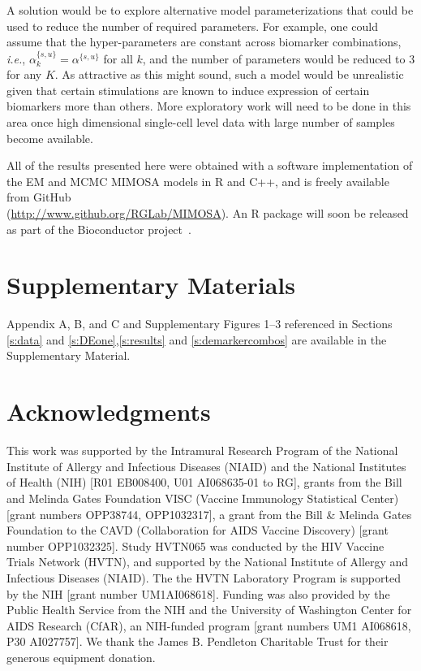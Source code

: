 \documentclass[12pt,oupdraft]{biostatistics}
\begin{document}
A solution would be to explore alternative model parameterizations that could be used to reduce the number of required parameters.
For example, one could assume that the hyper-parameters are constant across biomarker combinations, \textit{i.e.}, $\alpha^{\{s,u\}}_{k}=\alpha^{\{s,u\}}$ for all $k$, and the number of parameters would be reduced to $3$ for any $K$.
As attractive as this might sound, such a model would be unrealistic given that certain stimulations are known to induce expression of certain biomarkers more than others.
More exploratory work will need to be done in this area once high dimensional single-cell level data with large number of samples become available.

All of the results presented here were obtained with a software implementation of the EM and MCMC MIMOSA models in R and C++, and is freely available from GitHub \\
(\url{http://www.github.org/RGLab/MIMOSA}). An R package will soon be released as part of the Bioconductor project~\citep{Gentleman:2004tt}.

\section*{Supplementary Materials}

Appendix A, B, and C and Supplementary Figures 1--3 referenced in Sections \ref{s:data} and \ref{s:DEone},\ref{s:results} and \ref{s:demarkercombos} are available in the Supplementary Material.\vspace*{-8pt}

\section*{Acknowledgments}
This work was supported by the Intramural Research Program of the  National Institute of Allergy and Infectious Diseases (NIAID) and the National Institutes of Health (NIH) [R01 EB008400, U01 AI068635-01 to RG], grants from the Bill and Melinda Gates Foundation VISC (Vaccine Immunology Statistical Center) [grant numbers OPP38744,  OPP1032317], a grant from the Bill \& Melinda Gates Foundation to the CAVD (Collaboration for AIDS Vaccine Discovery) [grant number OPP1032325].  Study HVTN065 was conducted by the HIV Vaccine Trials Network (HVTN), and supported by the National Institute of Allergy and Infectious Diseases (NIAID). The the HVTN Laboratory Program is supported by the NIH [grant  number UM1AI068618]. Funding was also provided by the Public Health Service from the NIH and the University of Washington Center for AIDS Research (CfAR), an NIH-funded program [grant numbers UM1 AI068618, P30 AI027757]. We thank the James B. Pendleton Charitable Trust for their generous equipment donation.
\end{document}
